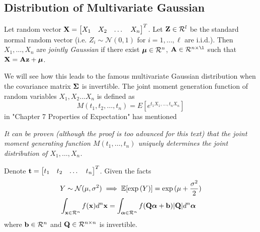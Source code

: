 \subsection{Distribution of Multivariate Gaussian}

\begin{tcolorbox}
[width=\linewidth, sharp corners=all, colback=white!95!black]
Let random vector $\mathbf{X} = \begin{bmatrix}X_1 & X_2 & \dots & X_n\end{bmatrix}^T$. Let $\mathbf{Z} \in \mathcal{R}^l$ be the standard normal random vector (i.e. $Z_i \sim \mathcal{N}(0,1)$ for $i=1,\dots,\ell$ are i.i.d.). Then $X_1,\dots, X_n$ are \textit{jointly Gaussian} if there exist $\boldsymbol{\mu} \in \mathcal{R}^n$, $\mA \in \re^{n \times \l}$ such that $\mathbf{X} = \mathbf{A} \mathbf{z} + \boldsymbol{\mu}$.
\end{tcolorbox}

We will see how this leads to the famous multivariate Gaussian distribution when the covariance matrix $\boldsymbol{\Sigma}$ is invertible. The joint moment generation function of random variables $X_1, X_2...X_n$ is defined as
\begin{equation*}
    M(t_1, t_2,\dots,t_n) = E[e^{t_1X_1,\dots,t_nX_n}]
\end{equation*}
\cite{ross2014first} in "Chapter 7 Properties of Expectation" has mentioned

\begin{center}
\textit{
It can be proven (although the proof is too advanced for this text) that the joint
moment generating function $M(t_1,\dots, t_n)$ uniquely determines the joint distribution of $X_1, \dots , X_n$.}
\end{center}
Denote $\mathbf{t} = \begin{bmatrix}t_1 & t_2 & \dots   & t_n \end{bmatrix}^T$. Given the facts
\begin{align*}
    &Y \sim \mathcal{N}(\mu, \sigma^2) \implies \mathbb{E}[\exp{(Y)}] = \exp{(\mu + \frac{\sigma^2}{2})}\\
    &\int_{\mathbf{x} \in \mathcal{R}^n} f(\mathbf{x}) d^n\mathbf{x} =  \int_{\boldsymbol{\alpha} \in \mathcal{R}^n} f(\mathbf{Q} \boldsymbol{\alpha} + \mathbf{b}) |\mathbf{Q}| d^n\boldsymbol{\alpha}
\end{align*}
where $\mathbf{b} \in \mathcal{R}^n$ and $\mathbf{Q} \in \mathcal{R}^{n \times n}$ is invertible.

